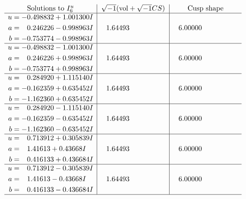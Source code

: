 \documentclass[1p]{elsarticle_modified}
\theoremstyle{definition}
\newcommand{\I}{\sqrt{-1}}
\begin{document}
$$\begin{array}{c|c|c}  
\text{Solutions to }I^u_{6}& \I (\text{vol} + \sqrt{-1}CS) & \text{Cusp shape}\\
 \hline 
\begin{aligned}
u &= -0.498832 + 1.001300 I \\
a &= \phantom{-}0.246226 - 0.998963 I \\
b &= -0.753774 - 0.998963 I\end{aligned}
 & \phantom{-}1.64493\phantom{ +0.000000I} & \phantom{-}6.00000\phantom{ +0.000000I} \\ \hline\begin{aligned}
u &= -0.498832 - 1.001300 I \\
a &= \phantom{-}0.246226 + 0.998963 I \\
b &= -0.753774 + 0.998963 I\end{aligned}
 & \phantom{-}1.64493\phantom{ +0.000000I} & \phantom{-}6.00000\phantom{ +0.000000I} \\ \hline\begin{aligned}
u &= \phantom{-}0.284920 + 1.115140 I \\
a &= -0.162359 + 0.635452 I \\
b &= -1.162360 + 0.635452 I\end{aligned}
 & \phantom{-}1.64493\phantom{ +0.000000I} & \phantom{-}6.00000\phantom{ +0.000000I} \\ \hline\begin{aligned}
u &= \phantom{-}0.284920 - 1.115140 I \\
a &= -0.162359 - 0.635452 I \\
b &= -1.162360 - 0.635452 I\end{aligned}
 & \phantom{-}1.64493\phantom{ +0.000000I} & \phantom{-}6.00000\phantom{ +0.000000I} \\ \hline\begin{aligned}
u &= \phantom{-}0.713912 + 0.305839 I \\
a &= \phantom{-}1.41613 + 0.43668 I \\
b &= \phantom{-}0.416133 + 0.436684 I\end{aligned}
 & \phantom{-}1.64493\phantom{ +0.000000I} & \phantom{-}6.00000\phantom{ +0.000000I} \\ \hline\begin{aligned}
u &= \phantom{-}0.713912 - 0.305839 I \\
a &= \phantom{-}1.41613 - 0.43668 I \\
b &= \phantom{-}0.416133 - 0.436684 I\end{aligned}
 & \phantom{-}1.64493\phantom{ +0.000000I} & \phantom{-}6.00000\phantom{ +0.000000I}\\
 \hline 
 \end{array}$$\newpage\newpage\renewcommand{\arraystretch}{1}
\end{document}
